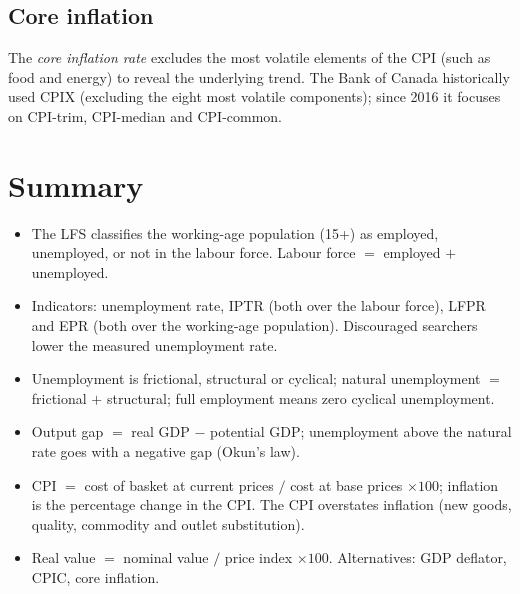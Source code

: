 \subsection{Core inflation}

\begin{definition}
The \emph{core inflation rate} excludes the most volatile elements of the CPI (such as
food and energy) to reveal the underlying trend. The Bank of Canada historically used
CPIX (excluding the eight most volatile components); since 2016 it focuses on CPI-trim,
CPI-median and CPI-common.
\end{definition}

\section{Summary}

\begin{itemize}
  \item The LFS classifies the working-age population (15+) as employed, unemployed, or
        not in the labour force. Labour force $=$ employed $+$ unemployed.
  \item Indicators: unemployment rate, IPTR (both over the labour force), LFPR and EPR
        (both over the working-age population). Discouraged searchers lower the measured
        unemployment rate.
  \item Unemployment is frictional, structural or cyclical; natural unemployment $=$
        frictional $+$ structural; full employment means zero cyclical unemployment.
  \item Output gap $=$ real GDP $-$ potential GDP; unemployment above the natural rate
        goes with a negative gap (Okun's law).
  \item CPI $=$ cost of basket at current prices $/$ cost at base prices $\times 100$;
        inflation is the percentage change in the CPI. The CPI overstates inflation (new
        goods, quality, commodity and outlet substitution).
  \item Real value $=$ nominal value $/$ price index $\times 100$. Alternatives: GDP
        deflator, CPIC, core inflation.
\end{itemize}
